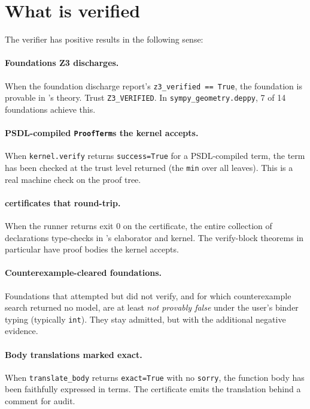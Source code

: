 \section{What is verified}

The verifier has positive results in the following sense:

\paragraph{Foundations Z3 discharges.}  When the foundation discharge
report's \texttt{z3\_verified == True}, the foundation is provable in
\Zthree's theory.  Trust \texttt{Z3\_VERIFIED}.  In
\texttt{sympy\_geometry.deppy}, 7 of 14 foundations achieve this.

\paragraph{PSDL-compiled \texttt{ProofTerm}s the kernel accepts.}
When \texttt{kernel.verify} returns \texttt{success=True} for a
PSDL-compiled term, the term has been checked at the trust level
returned (the \texttt{min} over all leaves).  This is a real
machine check on the proof tree.

\paragraph{\Lean{} certificates that round-trip.}  When the \Lean{}
runner returns exit 0 on the certificate, the entire collection of
declarations type-checks in \Lean{}'s elaborator and kernel.  The
verify-block theorems in particular have proof bodies the kernel
accepts.

\paragraph{Counterexample-cleared foundations.}  Foundations that
\Zthree{} attempted but did not verify, and for which counterexample
search returned no model, are at least \emph{not provably false}
under the user's binder typing (typically \texttt{int}).  They stay
admitted, but with the additional negative evidence.

\paragraph{Body translations marked exact.}  When
\texttt{translate\_body} returns \texttt{exact=True} with no
\texttt{sorry}, the function body has been faithfully expressed in
\Lean{} terms.  The certificate emits the translation behind a
comment for audit.

